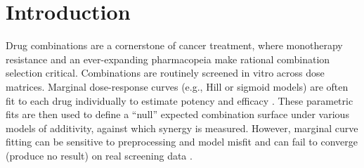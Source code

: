 \documentclass[pdflatex,sn-nature]{sn-jnl}%
\begin{document}

\maketitle

\section{Introduction}

Drug combinations are a cornerstone of cancer treatment, where monotherapy resistance and an ever-expanding pharmacopeia make rational combination selection critical.
Combinations are routinely screened in vitro across dose matrices.
Marginal dose-response curves (e.g., Hill or sigmoid models) are often fit to each drug individually to estimate potency and efficacy \cite{Huang2012,He2018}.
These parametric fits are then used to define a ``null'' expected combination surface under various models of additivity, against which synergy is measured.
However, marginal curve fitting can be sensitive to preprocessing and model misfit \cite{MuSyC2021} and can fail to converge (produce no result) on real screening data \cite{SynergyFinder2017}.
\end{document}
